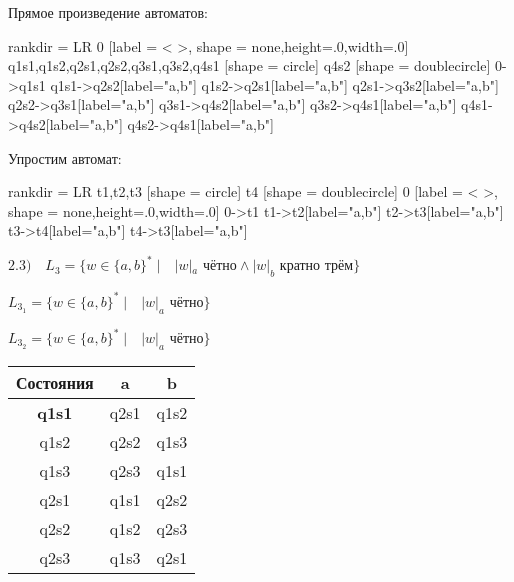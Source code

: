 \documentclass{article}
\begin{document}
Прямое произведение автоматов:

\begin{center}
 {
    rankdir = LR
    0 [label = < >, shape = none,height=.0,width=.0]
    q1s1,q1s2,q2s1,q2s2,q3s1,q3s2,q4s1 [shape = circle]
    q4s2 [shape = doublecircle]
    0->q1s1
    q1s1->q2s2[label="a,b"]
    q1s2->q2s1[label="a,b"]
    q2s1->q3s2[label="a,b"]
    q2s2->q3s1[label="a,b"]
    q3s1->q4s2[label="a,b"]
    q3s2->q4s1[label="a,b"]
    q4s1->q4s2[label="a,b"]
    q4s2->q4s1[label="a,b"]
    
}
\end{center}

Упростим автомат:

\begin{center}
 {
    rankdir = LR
    t1,t2,t3 [shape = circle]
    t4 [shape = doublecircle]
    0 [label = < >, shape = none,height=.0,width=.0]
    0->t1
    t1->t2[label="a,b"]
    t2->t3[label="a,b"]
    t3->t4[label="a,b"]
    t4->t3[label="a,b"]
    
}
\end{center}

\begin{center}
$2.3) \quad L_3 = \{w \in \{ a,b \}^* \; | \quad |w|_a \mbox { чётно} \wedge |w|_b \mbox{ кратно трём} \}$ \newline

$L_3_1 = \{w \in \{ a,b \}^* \; | \quad |w|_a \mbox { чётно}\}$ \newline


$L_3_2 = \{w \in \{ a,b \}^* \; | \quad |w|_a \mbox { чётно}\}$ \newline


\begin{tabular}{|c|c|c|}
            \hline
            Состояния & a & b \\
            \hline
            \textbf{q1s1} & q2s1 & q1s2\\
            q1s2 & q2s2 & q1s3\\
            q1s3 & q2s3 & q1s1\\
            q2s1 & q1s1 & q2s2\\
            q2s2 & q1s2 & q2s3\\
            q2s3 & q1s3 & q2s1\\
            \hline
\end{tabular}
\newline
\end{center} 
\end{document}
